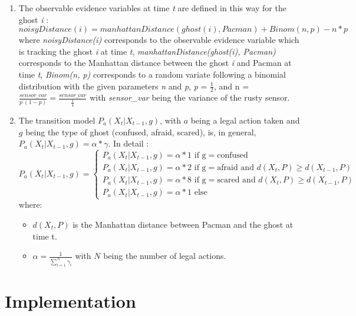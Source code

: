 \documentclass{article}
\begin{document}
\begin{enumerate}[label=\alph*.,leftmargin=*]
    \item The observable evidence variables at time \textit{t} are defined in
    this way for the ghost \textit{i} : \\
    
    $noisyDistance(i) = 
    manhattanDistance(ghost(i), Pacman) + Binom(n, p) - n * p$ \\

    where \textit{noisyDistance(i)} corresponds to the observable evidence variable 
    which is tracking the ghost \textit{i} at time \textit{t}, \textit{manhattanDistance(ghost(i), Pacman)}
    corresponds to the Manhattan distance between the ghost \textit{i} and Pacman at time \textit{t},
    \textit{Binom(n, p)} corresponds to a random variate following a binomial distribution with the given parameters
    \textit{n} and \textit{p}, \textit{p} = $\frac{1}{2}$, and n = $\frac{sensor\_var}{p \ (1 - p)} = \frac{sensor\_var}{\frac{1}{4}}$ with \textit{sensor\_var} being the variance of the rusty sensor.
    
    \item The transition model $P_a(X_t | X_{t-1}, g)$, with $a$ being a legal action taken and $g$ being the type of ghost (confused, afraid, scared), is, in general, $P_a(X_t | X_{t-1}, g) = \alpha * \gamma$. In detail :
    \[
  P_a(X_t | X_{t-1}, g)=\begin{cases}
               P_a(X_t | X_{t-1}, g) = \alpha * 1 \text{ if g} = \text{confused} \\
               P_a(X_t | X_{t-1}, g) = \alpha * 2 \text{ if g} = \text{afraid and }d(X_t, P) \geq d(X_{t-1},P) \\
               P_a(X_t | X_{t-1}, g) = \alpha * 8 \text{ if g} = \text{scared and }d(X_t, P) \geq d(X_{t-1},P) \\
               P_a(X_t | X_{t-1}, g) = \alpha * 1 \text{ else}
            \end{cases}
\]
where:
\begin{itemize}
	\item $d(X_t, P)$ is the Manhattan distance between Pacman and the ghost at time t.
	\item $\alpha = \frac{1}{\sum_{i=1}^N {\gamma_i}}$ with $N$ being the number of legal actions.
\end{itemize}

\end{enumerate}

\section{Implementation}
\end{document}
